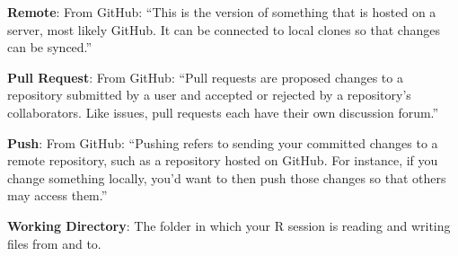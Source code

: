 \documentclass[]{book}
\begin{document}
\textbf{Remote}: From GitHub: ``This is the version of something that is
hosted on a server, most likely GitHub. It can be connected to local
clones so that changes can be synced.''

\textbf{Pull Request}: From GitHub: ``Pull requests are proposed changes
to a repository submitted by a user and accepted or rejected by a
repository's collaborators. Like issues, pull requests each have their
own discussion forum.''

\textbf{Push}: From GitHub: ``Pushing refers to sending your committed
changes to a remote repository, such as a repository hosted on GitHub.
For instance, if you change something locally, you'd want to then push
those changes so that others may access them.''

\textbf{Working Directory}: The folder in which your R session is
reading and writing files from and to.
\end{document}
